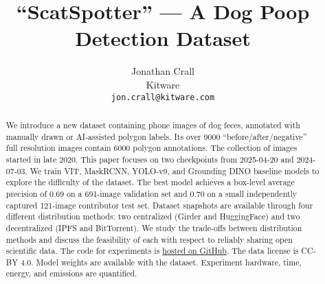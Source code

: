 \documentclass{article}
\title{``ScatSpotter'' --- A Dog Poop Detection Dataset}
\author{Jonathan Crall\\
Kitware\\
\texttt{jon.crall@kitware.com} \\
}
\newif\ifuseappendix
\newcommand{\repoBase}{https://github.com/Erotemic/scatspotter/blob/31f497e2586f0d1560b9bbd65415f9bd36a07585}
\newcommand{\repoBase}{https://anonymous.4open.science/r/scatspotter-DD67}
\begin{document}
\maketitle

\begin{abstract}

We introduce a new dataset containing phone images of dog feces, annotated with manually drawn or AI-assisted polygon labels.  Its over 9000 ``before/after/negative'' full resolution images contain 6000 polygon annotations.  The collection of images started in late 2020.  This paper focuses on two checkpoints from 2025-04-20 and 2024-07-03.  We train VIT, MaskRCNN, YOLO-v9, and Grounding DINO baseline models to explore the difficulty of the dataset.  The best model achieves a box-level average precision of 0.69 on a 691-image validation set and 0.70 on a small independently captured 121-image contributor test set.  Dataset snapshots are available through four different distribution methods: two centralized (Girder and HuggingFace) and two decentralized (IPFS and BitTorrent).  We study the trade-offs between distribution methods and discuss the feasibility of each with respect to reliably sharing open scientific data.  The code for experiments is \href{\repoBase}{hosted on GitHub}.  The data license is CC-BY 4.0.  Model weights are available with the dataset.  Experiment hardware, time, energy, and emissions are quantified.


\end{abstract}





\FloatBarrier



{\small


}


\ifuseappendix

%
\fi
\end{document}
